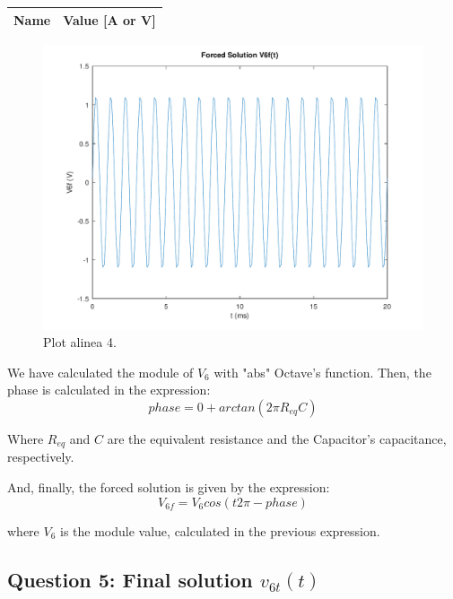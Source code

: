 \begin{center}
  \begin{tabular}{ | c | c | }
    \hline    
    {\bf Name} & {\bf Value [A or V]} \\ \hline
    
    \hline
  \end{tabular}
\end{center}

\begin{figure}[H] \centering
\includegraphics[width=0.7\linewidth]{../mat/alinea4.pdf}
\caption{Plot alinea 4.}
\label{fig:plot4}
\end{figure}


We have calculated the module of $V_6$ with "abs" Octave's function. Then, the phase is calculated in the expression:
\begin{equation}
     phase = 0 + arctan({2\pi}{R_{eq}}{C})
\end{equation}\par

Where $R_{eq}$ and $C$ are the equivalent resistance and the Capacitor's capacitance, respectively.

And, finally, the forced solution is given by the expression:
\begin{equation}
     V_{6f}= V_6cos({t}{2\pi} - phase)
\end{equation}\par
where $V_6$ is the module value, calculated in the previous expression.


\subsection{Question 5: Final solution $v_{6t}(t)$ }




